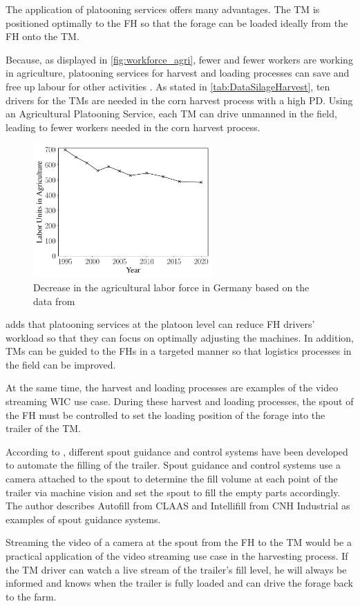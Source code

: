 The application of platooning services offers many advantages.
The \ac{TM} is positioned optimally to the \ac{FH} so that the forage can be loaded ideally from the \ac{FH} onto the \ac{TM}.

Because, as displayed in \autoref{fig:workforce_agri}, fewer and fewer workers are working in agriculture, platooning services for harvest and loading processes can save and free up labour for other activities \cite{liu_automation_2022}. As stated in \autoref{tab:DataSilageHarvest}, ten drivers for the \ac{TM}s are needed in the corn harvest process with a high \ac{PD}. Using an Agricultural Platooning Service, each \ac{TM} can drive unmanned in the field, leading to fewer workers needed in the corn harvest process.

\begin{figure}[H]
   \centering
   \includegraphics[width=0.61\textwidth]{figures/WorkForceAgriculture.pdf}
   \caption{Decrease in the agricultural labor force in Germany based on the data from \cite{bmel2020}}%
   \label{fig:workforce_agri}%
\end{figure}

\textcite{smolnik_5g_2020} adds that platooning services at the platoon level can reduce \ac{FH} drivers' workload so that they can focus on optimally adjusting the machines.
In addition, \ac{TM}s can be guided to the \ac{FH}s in a targeted manner so that logistics processes in the field can be improved.

At the same time, the harvest and loading processes are examples of the video streaming \ac{WIC} use case.
During these harvest and loading processes, the spout of the \ac{FH} must be controlled to set the loading position of the forage into the trailer of the \ac{TM}.

According to \textcite{murcia_quadrotor_2014}, different spout guidance and control systems have been developed
to automate the filling of the trailer.
Spout guidance and control systems use a camera attached to the spout to determine the fill volume at each point of the
trailer via machine vision and set the spout to fill the empty parts accordingly.
The author describes Autofill from CLAAS and Intellifill from CNH Industrial as examples of
spout guidance systems.

Streaming the video of a camera at the spout from the \ac{FH} to the \ac{TM} would be a practical application of the video streaming use case in the harvesting process. If the \ac{TM} driver can watch a live stream of the trailer's fill level, he will always be
informed and knows when the trailer is fully loaded and can drive the forage back to the
farm.

